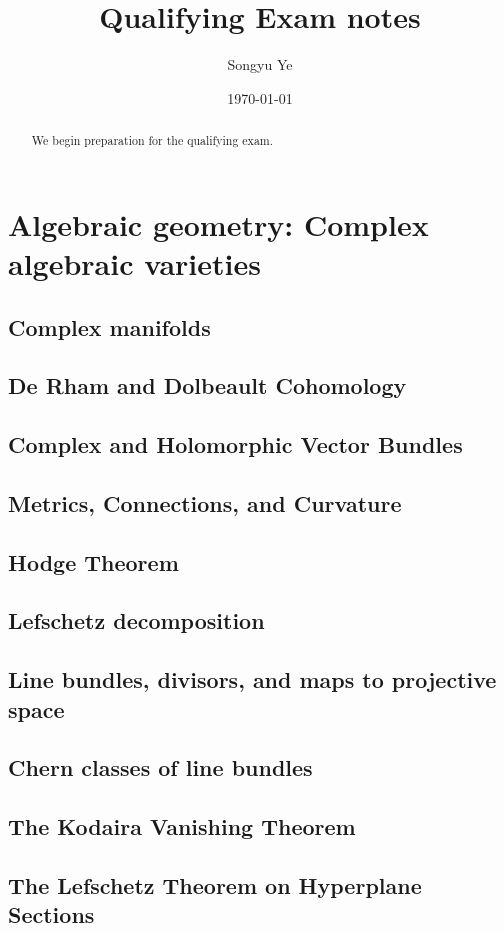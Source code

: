 \documentclass[12pt]{article}
\title{Qualifying Exam notes}
\author{Songyu Ye}
\date{\today}
\begin{document}
\notestitle

\begin{abstract}
    We begin preparation for the qualifying exam.
\end{abstract}

\tableofcontents
\section{Algebraic geometry: Complex algebraic varieties}

\subsection{Complex manifolds}
\subsection{De Rham and Dolbeault Cohomology}
\subsection{Complex and Holomorphic Vector Bundles}
\subsection{Metrics, Connections, and Curvature}
\subsection{Hodge Theorem}
\subsection{Lefschetz decomposition}
\subsection{Line bundles, divisors, and maps to projective space}
\subsection{Chern classes of line bundles}
\subsection{The Kodaira Vanishing Theorem}
\subsection{The Lefschetz Theorem on Hyperplane Sections }
\end{document}
